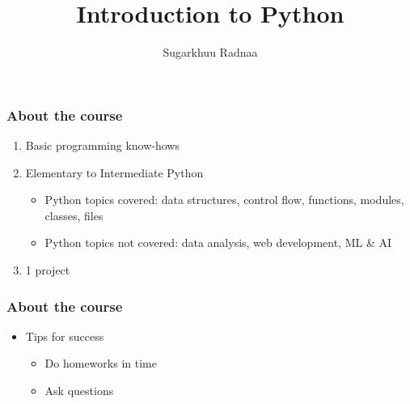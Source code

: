\documentclass{beamer}
\title[Python Intro]{Introduction to Python} %
\author{Sugarkhuu Radnaa} %
\institute[] %
{
Py4Econ in Ulaanbaatar \\ %
\medskip
\textit{py4econ@gmail.com} %
}
\date{}  %
\begin{document}
\begin{frame}
\titlepage %
\end{frame}

\begin{frame}
\frametitle{About the course} %
\begin{enumerate}
    \item Basic programming know-hows
    \item Elementary to Intermediate Python
        \begin{itemize}
            \item Python topics covered: data structures, control flow, functions, modules, classes, files
            \item Python topics not covered: data analysis, web development, ML \& AI
        \end{itemize}
    \item 1 project
\end{enumerate}
\end{frame}

\begin{frame}
    \frametitle{About the course} %
    \begin{itemize}
        \item Tips for success
            \begin{itemize}
                \item Do homeworks in time
                \item Ask questions
            \end{itemize}
    \end{itemize}        
    \end{frame}
\end{document}
